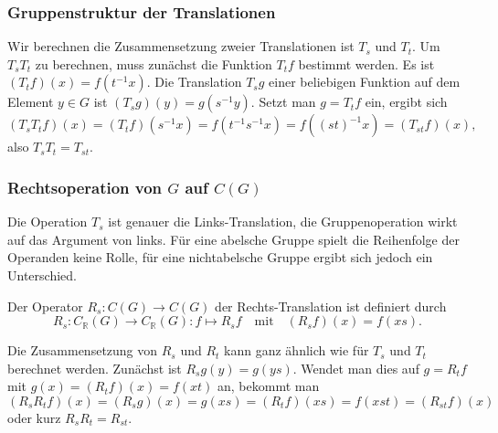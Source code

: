 %
%
\subsubsection{Gruppenstruktur der Translationen}
Wir berechnen die Zusammensetzung zweier Translationen ist $T_s$ und $T_t$.
Um $T_sT_t$ zu berechnen, muss zunächst die Funktion $T_tf$ bestimmt werden.
Es ist $(T_tf)(x) = f(t^{-1}x)$.
Die Translation $T_sg$ einer beliebigen Funktion auf dem Element $y\in G$
ist $(T_sg)(y)=g(s^{-1}y)$.
Setzt man $g=T_tf$ ein, ergibt sich
\[
(T_sT_tf)(x)
=
(T_tf)(s^{-1}x)
=
f(t^{-1}s^{-1}x)
=
f((st)^{-1}x)
=
(T_{st}f)(x),
\]
also $T_sT_t=T_{st}$.

%
%
\subsubsection{Rechtsoperation von $G$ auf $C(G)$}
Die Operation $T_s$ ist genauer die Links-Translation, die Gruppenoperation
wirkt auf das Argument von links.
Für eine abelsche Gruppe spielt die Reihenfolge der Operanden keine
Rolle, für eine nichtabelsche Gruppe ergibt sich jedoch ein Unterschied.

\begin{definition}
Der Operator $R_s\colon C(G)\to C(G)$ der Rechts-Translation ist definiert
durch
\[
R_s
\colon
C_{\mathbb{R}}(G)\to C_{\mathbb{R}}(G)
:
f \mapsto R_sf
\quad\text{mit}\quad
(R_sf)(x) = f(xs).
\]
\end{definition}

Die Zusammensetzung von $R_s$ und $R_t$ kann ganz ähnlich wie für
$T_s$ und $T_t$ berechnet werden.
Zunächst ist $R_sg(y) = g(ys)$.
Wendet man dies auf $g=R_tf$ mit $g(x)=(R_tf)(x)=f(xt)$ an, bekommt man
\[
(R_sR_tf)(x)
=
(R_sg)(x)
=
g(xs)
=
(R_tf)(xs)
=
f(xst)
=
(R_{st}f)(x)
\]
oder kurz $R_sR_t=R_{st}$.






